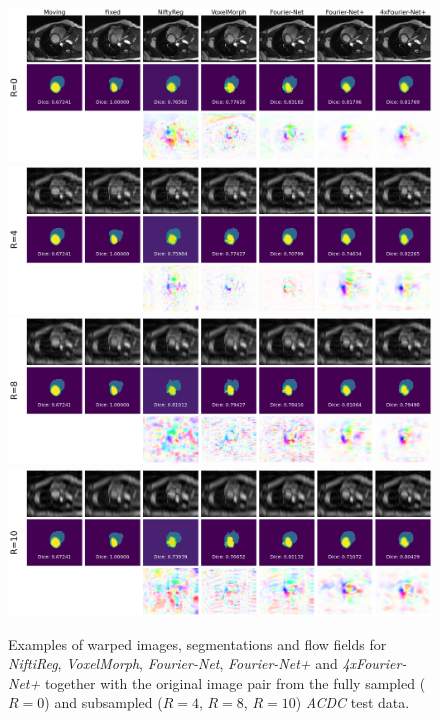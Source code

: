 \documentclass[english,version-2022-01]{uzl-thesis} %
\begin{document}
\begin{figure}[H]
	\centering
	\graphicspath{{images/}{\main/images/}}
	\includegraphics[width=\textwidth]{TestExamples_Mode0.png}
    	\includegraphics[width=\textwidth]{TestExamples_Mode1.png}
    	\includegraphics[width=\textwidth]{TestExamples_Mode2.png}
    	\includegraphics[width=\textwidth]{TestExamples_Mode3.png}	
	\caption{Examples of warped images, segmentations and flow fields for \emph{NiftiReg}, \emph{VoxelMorph}, \emph{Fourier-Net}, \emph{Fourier-Net+} and \emph{4xFourier-Net+} together with the original image pair from the fully sampled ($R=0$) and subsampled ($R=4$, $R=8$, $R=10$) \emph{ACDC} test data.}
	\label{fig:TestExamples}
\end{figure}
\end{document}

